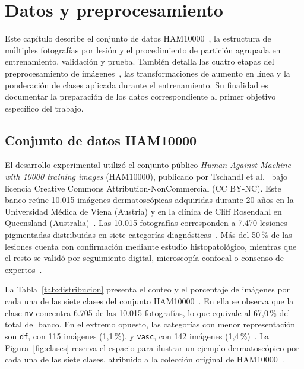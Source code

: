 \chapter{Datos y preprocesamiento}

Este capítulo describe el conjunto de datos HAM10000~\cite{tschandl2018ham10000}, la estructura de múltiples fotografías por lesión y el procedimiento de partición agrupada en entrenamiento, validación y prueba. También detalla las cuatro etapas del preprocesamiento de imágenes~\cite{lee1997dullrazor,telea2004inpainting,zuiderveld1994clahe}, las transformaciones de aumento en línea y la ponderación de clases aplicada durante el entrenamiento. Su finalidad es documentar la preparación de los datos correspondiente al primer objetivo específico del trabajo.

\section{Conjunto de datos HAM10000}

El desarrollo experimental utilizó el conjunto público \textit{Human Against Machine with 10000 training images} (HAM10000), publicado por Tschandl et al.~\cite{tschandl2018ham10000} bajo licencia Creative Commons Attribution-NonCommercial (CC BY-NC). Este banco reúne 10.015 imágenes dermatoscópicas adquiridas durante 20 años en la Universidad Médica de Viena (Austria) y en la clínica de Cliff Rosendahl en Queensland (Australia)~\cite{tschandl2018ham10000}. Las 10.015 fotografías corresponden a 7.470 lesiones pigmentadas distribuidas en siete categorías diagnósticas~\cite{tschandl2018ham10000}. Más del 50\,\% de las lesiones cuenta con confirmación mediante estudio histopatológico, mientras que el resto se validó por seguimiento digital, microscopía confocal o consenso de expertos~\cite{tschandl2018ham10000}.

La Tabla~\ref{tab:distribucion} presenta el conteo y el porcentaje de imágenes por cada una de las siete clases del conjunto HAM10000~\cite{tschandl2018ham10000}. En ella se observa que la clase \texttt{nv} concentra 6.705 de las 10.015 fotografías, lo que equivale al 67,0\,\% del total del banco. En el extremo opuesto, las categorías con menor representación son \texttt{df}, con 115 imágenes (1,1\,\%), y \texttt{vasc}, con 142 imágenes (1,4\,\%)~\cite{tschandl2018ham10000}. La Figura~\ref{fig:clases} reserva el espacio para ilustrar un ejemplo dermatoscópico por cada una de las siete clases, atribuido a la colección original de HAM10000~\cite{tschandl2018ham10000}.

